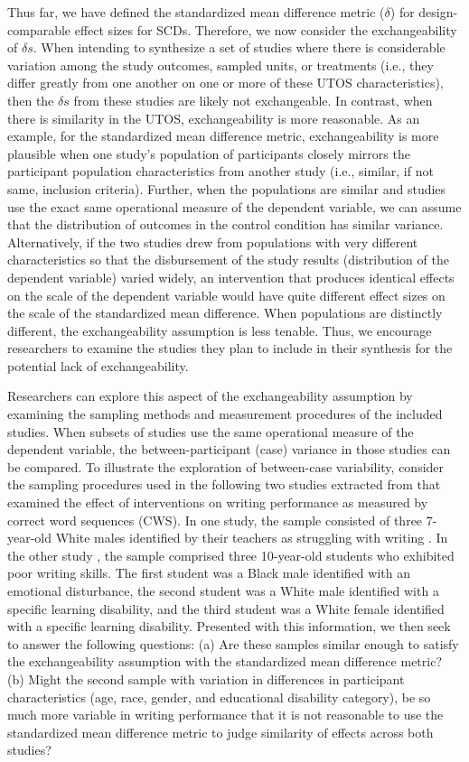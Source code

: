 \documentclass[
]{book}
\begin{document}
Thus far, we have defined the standardized mean difference metric (\(\delta\)) for design-comparable effect sizes for SCDs. Therefore, we now consider the exchangeability of \(\delta s\). When intending to synthesize a set of studies where there is considerable variation among the study outcomes, sampled units, or treatments (i.e., they differ greatly from one another on one or more of these UTOS characteristics), then the \(\delta s\) from these studies are likely not exchangeable. In contrast, when there is similarity in the UTOS, exchangeability is more reasonable. As an example, for the standardized mean difference metric, exchangeability is more plausible when one study's population of participants closely mirrors the participant population characteristics from another study (i.e., similar, if not same, inclusion criteria). Further, when the populations are similar and studies use the exact same operational measure of the dependent variable, we can assume that the distribution of outcomes in the control condition has similar variance. Alternatively, if the two studies drew from populations with very different characteristics so that the disbursement of the study results (distribution of the dependent variable) varied widely, an intervention that produces identical effects on the scale of the dependent variable would have quite different effect sizes on the scale of the standardized mean difference. When populations are distinctly different, the exchangeability assumption is less tenable. Thus, we encourage researchers to examine the studies they plan to include in their synthesis for the potential lack of exchangeability.

Researchers can explore this aspect of the exchangeability assumption by examining the sampling methods and measurement procedures of the included studies. When subsets of studies use the same operational measure of the dependent variable, the between-participant (case) variance in those studies can be compared. To illustrate the exploration of between-case variability, consider the sampling procedures used in the following two studies extracted from \citet{datchuk2020Level} that examined the effect of interventions on writing performance as measured by correct word sequences (CWS). In one study, the sample consisted of three 7-year-old White males identified by their teachers as struggling with writing \citep{parker2012Application}. In the other study \citep{stotz2008Effects}, the sample comprised three 10-year-old students who exhibited poor writing skills. The first student was a Black male identified with an emotional disturbance, the second student was a White male identified with a specific learning disability, and the third student was a White female identified with a specific learning disability. Presented with this information, we then seek to answer the following questions: (a) Are these samples similar enough to satisfy the exchangeability assumption with the standardized mean difference metric? (b) Might the second sample with variation in differences in participant characteristics (age, race, gender, and educational disability category), be so much more variable in writing performance that it is not reasonable to use the standardized mean difference metric to judge similarity of effects across both studies?
\end{document}
